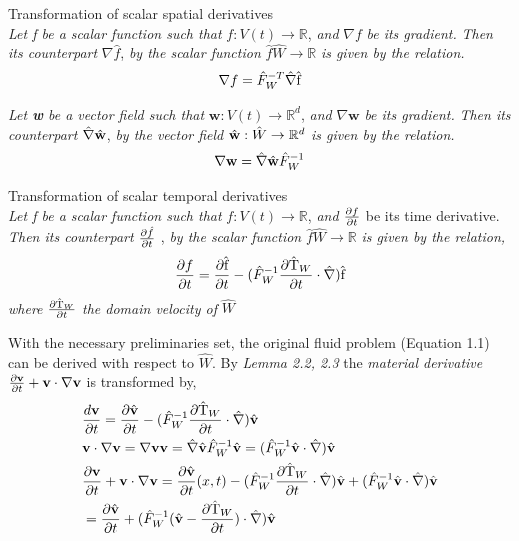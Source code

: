 \begin{lem}
Transformation of scalar spatial derivatives \\
\textit{Let f be a scalar function such that} $f: V(t) \rightarrow \mathbb{R}$, \textit{and} $\nabla f$ \textit{be its gradient.}
\textit{Then its counterpart} $\nabla \hat{f}$, \textit{by the scalar function} $\hat{f} \hat{W} \rightarrow \mathbb{R}$ \textit{is given by the relation.} 
\begin{align}
\nabla f = \hat{F}_W^{-T} \hat{\nabla}\text{\^{f}}
\end{align} 
\end{lem}
\begin{lem}
\textit{Let \textbf{w} be a vector field such that} $\mathbf{w}: V(t) \rightarrow \mathbb{R}^d$, \textit{and} $\nabla \mathbf{w}$ \textit{be its gradient.}
\textit{Then its counterpart} $\hat{\mathbf{\nabla}}\hat{\mathbf{w}}$, \textit{by the vector field} $\hat{\mathbf{w}}: \hat{W} \rightarrow \mathbb{R}^d$ \textit{is given by the relation.} 
\begin{align}
\nabla \mathbf{w} = \hat{\mathbf{\nabla}}\hat{\mathbf{w}} \hat{F}_W^{-1} 
\end{align} 
\end{lem}
\begin{lem}
Transformation of scalar temporal derivatives \\
\textit{Let f be a scalar function such that} $f: V(t) \rightarrow \mathbb{R}$, \textit{and} $\frac{\partial f}{\partial t}$ be its time derivative. \textit{Then its counterpart} $\frac{\partial \hat{f}}{\partial t}$ , \textit{by the scalar function} $\hat{f} \hat{W} \rightarrow \mathbb{R}$ \textit{is given by the relation,} 
\begin{align}
\frac{\partial f}{\partial t} = \frac{\partial \text{\^{f}} }{\partial t} - (\hat{F}_W^{-1} \frac{\partial \text{\^{T}}_W}{\partial t} \cdot \hat{\nabla}) \text{\^{f}}
\end{align}
 \textit{where} $\frac{\partial \text{\^{T}}_W}{\partial t}$ \textit{the domain velocity of} $\hat{W}$
\end{lem}
With the necessary preliminaries set, the original fluid problem (Equation 1.1) can be derived with respect to $\hat{W}$. By \textit{Lemma 2.2, 2.3} the \textit{material derivative} $\frac{\partial \mathbf{v}}{\partial t} + \mathbf{v} \cdot \nabla \mathbf{v}$ is transformed by, 
\begin{align}
&\frac{d \mathbf{v}}{\partial t} = 
\frac{\partial \hat{\mathbf{v}}}{\partial t} - (\hat{F}_W^{-1}\frac{\partial \text{\^{T}}_W}{\partial t} \cdot \hat{\nabla})\hat{\mathbf{v}} \\
&\mathbf{v} \cdot \nabla \mathbf{v} = \nabla \mathbf{v} \mathbf{v} = 
\hat{\mathbf{\nabla}}\hat{\mathbf{v}}\hat{F}_W^{-1}\hat{\mathbf{v}} = (\hat{F}_W^{-1}\hat{\mathbf{v}} \cdot \hat{\nabla})\hat{\mathbf{v}} \\
&\frac{\partial \mathbf{v}}{\partial t} + \mathbf{v} \cdot \nabla \mathbf{v} = 
\frac{\partial \hat{\mathbf{v}}}{\partial t}(x,t) - (\hat{F}_W^{-1}\frac{\partial \text{\^{T}}_W}{\partial t} \cdot \hat{\nabla})\hat{\mathbf{v}}
+ (\hat{F}_W^{-1}\hat{\mathbf{v}} \cdot \hat{\nabla})\hat{\mathbf{v}}  \\
&= \frac{\partial \hat{\mathbf{v}}}{\partial t} + (\hat{F}_W^{-1}(\hat{\mathbf{v}} - \frac{\partial \text{\^{T}}_W}{\partial t}) \cdot \hat{\nabla}) \hat{\mathbf{v}}
\end{align}
